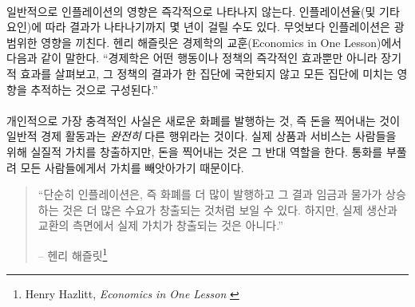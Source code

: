 \paragraph{}
일반적으로 인플레이션의 영향은 즉각적으로 나타나지 않는다. 
인플레이션율(및 기타 요인)에 따라 결과가 나타나기까지 몇 년이 걸릴 수도 있다. 
무엇보다 인플레이션은 광범위한 영향을 끼친다. 
헨리 해즐릿은 경제학의 교훈(Economics in One Lesson)에서 다음과 같이 말한다. 
\enquote{경제학은 어떤 행동이나 정책의 즉각적인 효과뿐만 아니라 장기적 효과를 살펴보고, 
	그 정책의 결과가 한 집단에 국한되지 않고 모든 집단에 미치는 영향을 추적하는 것으로 구성된다.}


\paragraph{}
개인적으로 가장 충격적인 사실은 새로운 화폐를 발행하는 것, 즉 돈을 찍어내는 것이 
일반적 경제 활동과는 \textit{완전히} 다른 행위라는 것이다. 
실제 상품과 서비스는 사람들을 위해 실질적 가치를 창출하지만, 
돈을 찍어내는 것은 그 반대 역할을 한다. 통화를 부풀려 모든 사람들에게서 가치를 빼앗아가기 때문이다. 

\begin{quotation}\begin{samepage}
		\enquote{단순히 인플레이션은, 즉 화폐를 더 많이 발행하고 그 결과 임금과 물가가 상승하는 것은 
		더 많은 수요가 창출되는 것처럼 보일 수 있다. 하지만, 실제 생산과 교환의 측면에서 실제 가치가 창출되는 것은 아니다.}
		\begin{flushright} -- 헨리 해즐릿\footnote{Henry Hazlitt, \textit{Economics in One Lesson} \cite{hazlitt}}
\end{flushright}\end{samepage}\end{quotation}

